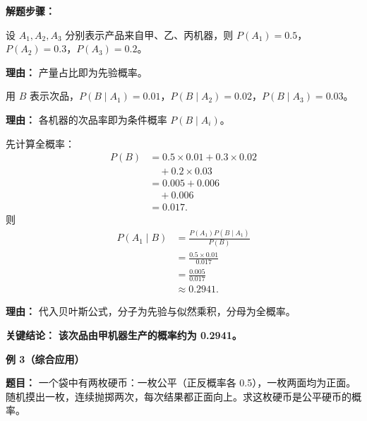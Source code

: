\begin{examplebox}
	\textbf{\textcolor{CExample}{解题步骤：}}
	\begin{description}[style=nextline, leftmargin=2.8em, labelsep=0.5em, itemsep=0.45em]
		\item[\textbf{第一步（设定先验）：}] 设 $A_1,A_2,A_3$ 分别表示产品来自甲、乙、丙机器，则 $P(A_1)=0.5$，$P(A_2)=0.3$，$P(A_3)=0.2$。
			\par\textbf{理由：} 产量占比即为先验概率。
		\item[\textbf{第二步（确定似然）：}] 用 $B$ 表示次品，$P(B\mid A_1)=0.01$，$P(B\mid A_2)=0.02$，$P(B\mid A_3)=0.03$。
			\par\textbf{理由：} 各机器的次品率即为条件概率 $P(B\mid A_i)$。
		\item[\textbf{第三步（代入公式）：}] 先计算全概率：
			\[
				\begin{aligned}
					P(B) &= 0.5\times0.01 + 0.3\times0.02 \\
					&\quad + 0.2\times0.03 \\
					&= 0.005 + 0.006 \\
					&\quad + 0.006 \\
					&= 0.017.
			\end{aligned}
			\]
			则
			\[
				\begin{aligned}
					P(A_1\mid B) &= \frac{P(A_1)P(B\mid A_1)}{P(B)} \\
					&= \frac{0.5\times0.01}{0.017} \\
					&= \frac{0.005}{0.017} \\
					&\approx 0.2941.
			\end{aligned}
			\]
			\par\textbf{理由：} 代入贝叶斯公式，分子为先验与似然乘积，分母为全概率。
	\end{description}

	\textbf{\textcolor{CExample}{关键结论：}}
	\textbf{该次品由甲机器生产的概率约为 0.2941。}

	\medskip
	\textbf{\textcolor{CExample}{例 3（综合应用）}}

	\textbf{\textcolor{CExample}{题目：}}
	一个袋中有两枚硬币：一枚公平（正反概率各 0.5），一枚两面均为正面。随机摸出一枚，连续抛掷两次，每次结果都正面向上。求这枚硬币是公平硬币的概率。


\end{examplebox}
